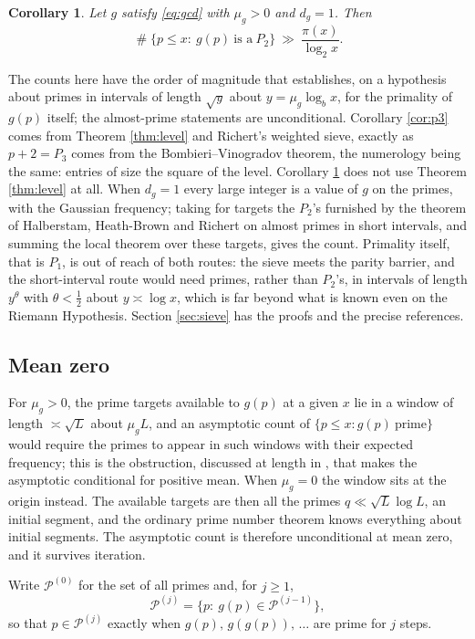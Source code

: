 \documentclass[11pt,reqno]{amsart}
\theoremstyle{plain}
\newtheorem{corollary}[theorem]{Corollary}
\theoremstyle{definition}
\DeclareMathOperator{\Card}{\#}
\begin{document}
\begin{corollary}\label{cor:p2}
Let $g$ satisfy \eqref{eq:gcd} with $\mu_g>0$ and $d_g=1$. Then
\[
\Card\{p\le x:\ g(p)\ \text{is a}\ P_2\}\ \gg\ \frac{\pi(x)}{\log_2 x}.
\]
\end{corollary}

The counts here have the order of magnitude that \cite{vibefrtz} establishes, on a hypothesis about primes in intervals of length $\sqrt y$ about $y=\mu_g\log_bx$, for the primality of $g(p)$ itself; the almost-prime statements are unconditional. Corollary \ref{cor:p3} comes from Theorem \ref{thm:level} and Richert's weighted sieve, exactly as $p+2=P_3$ comes from the Bombieri--Vinogradov theorem, the numerology being the same: entries of size the square of the level. Corollary \ref{cor:p2} does not use Theorem \ref{thm:level} at all. When $d_g=1$ every large integer is a value of $g$ on the primes, with the Gaussian frequency; taking for targets the $P_2$'s furnished by the theorem of Halberstam, Heath-Brown and Richert \cite{hhbr} on almost primes in short intervals, and summing the local theorem over these targets, gives the count. Primality itself, that is $P_1$, is out of reach of both routes: the sieve meets the parity barrier, and the short-interval route would need primes, rather than $P_2$'s, in intervals of length $y^{\theta}$ with $\theta<\tfrac12$ about $y\asymp\log x$, which is far beyond what is known even on the Riemann Hypothesis. Section \ref{sec:sieve} has the proofs and the precise references.

\subsection{Mean zero}
For $\mu_g>0$, the prime targets available to $g(p)$ at a given $x$ lie in a window of length $\asymp\sqrt{L}$ about $\mu_gL$, and an asymptotic count of $\{p\le x: g(p)\ \text{prime}\}$ would require the primes to appear in such windows with their expected frequency; this is the obstruction, discussed at length in \cite{vibefrtz}, that makes the asymptotic conditional for positive mean. When $\mu_g=0$ the window sits at the origin instead. The available targets are then all the primes $q\ll\sqrt L\log L$, an initial segment, and the ordinary prime number theorem knows everything about initial segments. The asymptotic count is therefore unconditional at mean zero, and it survives iteration.

Write $\mathcal P^{(0)}$ for the set of all primes and, for $j\ge1$,
\[
\mathcal P^{(j)}=\{p:\ g(p)\in\mathcal P^{(j-1)}\},
\]
so that $p\in\mathcal P^{(j)}$ exactly when $g(p),\,g(g(p)),\,\dots$ are prime for $j$ steps.
\end{document}
